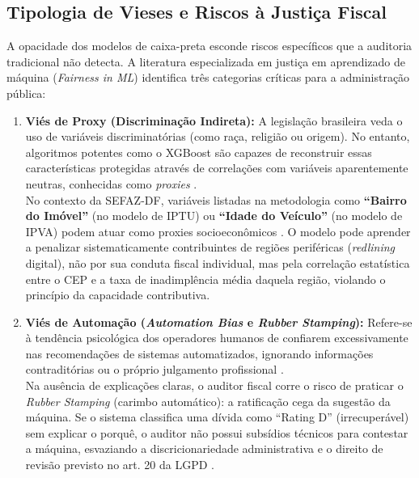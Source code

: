 \subsection{Tipologia de Vieses e Riscos à Justiça Fiscal}
A opacidade dos modelos de caixa-preta esconde riscos específicos que a auditoria tradicional não detecta. A literatura especializada em justiça em aprendizado de máquina (\textit{Fairness in ML}) identifica três categorias críticas para a administração pública:

\begin{enumerate}
    \item \textbf{Viés de Proxy (Discriminação Indireta):}
    A legislação brasileira veda o uso de variáveis discriminatórias (como raça, religião ou origem).  No entanto, algoritmos potentes como o XGBoost são capazes de reconstruir essas características protegidas através de correlações com variáveis aparentemente neutras, conhecidas como \textit{proxies} \cite{barocasBigDataDisparate2016}.
    \\
    No contexto da SEFAZ-DF, variáveis listadas na metodologia como \textbf{``Bairro do Imóvel''} (no modelo de IPTU) ou \textbf{``Idade do Veículo''} (no modelo de IPVA) podem atuar como proxies socioeconômicos \cite{sefazdf2025rating}. O modelo pode aprender a penalizar sistematicamente contribuintes de regiões periféricas (\textit{redlining} digital), não por sua conduta fiscal individual, mas pela correlação estatística entre o CEP e a taxa de inadimplência média daquela região, violando o princípio da capacidade contributiva. 

    \item \textbf{Viés de Automação (\textit{Automation Bias} e \textit{Rubber Stamping}):}
    Refere-se à tendência psicológica dos operadores humanos de confiarem excessivamente nas recomendações de sistemas automatizados, ignorando informações contraditórias ou o próprio julgamento profissional \cite{skitkaDoesAutomationBias1999}.
    \\
    Na ausência de explicações claras, o auditor fiscal corre o risco de praticar o \textit{Rubber Stamping} (carimbo automático): a ratificação cega da sugestão da máquina.  Se o sistema classifica uma dívida como ``Rating D'' (irrecuperável) sem explicar o porquê, o auditor não possui subsídios técnicos para contestar a máquina, esvaziando a discricionariedade administrativa e o direito de revisão previsto no art. 20 da LGPD \cite{brasilLGPD2018} \cite{brauneisAlgorithmicTransparencyAccountability2018}. 


\end{enumerate}
